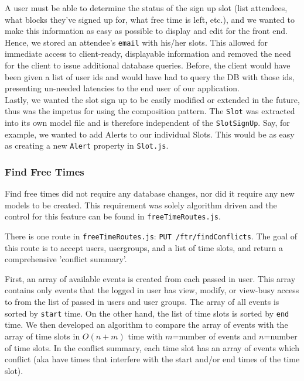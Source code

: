 \documentclass[11pt]{article}   %
\begin{document}
\noindent A user must be able to determine the status of the sign up slot (list attendees, what blocks they've signed up for, what free time is left, etc.), and we wanted to make this information as easy as possible to display and edit for the front end. Hence, we stored an attendee's \texttt{email} with his/her slots. This allowed for immediate access to client-ready, displayable information and removed the need for the client to issue additional database queries. Before, the client would have been given a list of user ids and would have had to query the DB with those ids, presenting un-needed latencies to the end user of our application.\\

\noindent Lastly, we wanted the slot sign up to be easily modified or extended in the future, thus was the impetus for using the composition pattern. The \texttt{Slot} was extracted into its own model file and is therefore independent of the \texttt{SlotSignUp}. Say, for example, we wanted to add Alerts to our individual Slots. This would be as easy as creating a new \texttt{Alert} property in \texttt{Slot.js}.

\subsubsection{Find Free Times}
Find free times did not require any database changes, nor did it require any new models to be created. This requirement was solely algorithm driven and the control for this feature can be found in \texttt{freeTimeRoutes.js}. 

There is one route in \texttt{freeTimeRoutes.js}: \texttt{PUT /ftr/findConflicts}.  The goal of this route is to accept users, usergroups, and a list of time slots, and return a comprehensive 'conflict summary'.

First, an array of available events is created from each passed in user.  This array contains only events that the logged in user  has view, modify, or view-busy access to from the list of passed in users and user groups.  The array of all events is sorted by \texttt{start} time. On the other hand, the list of time slots is sorted by \texttt{end} time.  We then developed an algorithm to compare the array of events with the array of time slots in $O(n+m)$ time with $m$=number of events and $n$=number of time slots.  In the conflict summary, each time slot has an array of events which conflict (aka have times that interfere with the start and/or end times of the time slot). 
\end{document}
